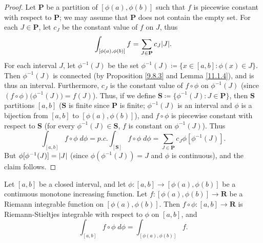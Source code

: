 \begin{proof}
    Let \(\mathbf{P}\) be a partition of \([\phi(a), \phi(b)]\) such that \(f\) is piecewise constant with respect to \(\mathbf{P}\);
    we may assume that \(\mathbf{P}\) does not contain the empty set.
    For each \(J \in \mathbf{P}\), let \(c_J\) be the constant value of \(f\) on \(J\), thus
    \[
        \int_{[\phi(a), \phi(b)]} f = \sum_{J \in \mathbf{P}} c_J \abs*{J}.
    \]
    For each interval \(J\), let \(\phi^{-1}(J)\) be the set \(\phi^{-1}(J) \coloneqq \{x \in [a, b] : \phi(x) \in J\}\).
    Then \(\phi^{-1}(J)\) is connected (by Proposition \ref{9.8.3} and Lemma \ref{11.1.4}), and is thus an interval.
    Furthermore, \(c_J\) is the constant value of \(f \circ \phi\) on \(\phi^{-1}(J)\) (since \((f \circ \phi)\big(\phi^{-1}(J)\big) = f(J)\)).
    Thus, if we define \(\mathbf{S} \coloneqq \{\phi^{-1} (J) : J \in \mathbf{P}\}\), then \(\mathbf{S}\) partitions \([a, b]\)
    (\(\mathbf{S}\) is finite since \(\mathbf{P}\) is finite;
    \(\phi^{-1}(J)\) is an interval and \(\phi\) is a bijection from \([a, b]\) to \([\phi(a), \phi(b)]\)),
    and \(f \circ \phi\) is piecewise constant with respect to \(\mathbf{S}\) (for every \(\phi^{-1}(J) \in \mathbf{S}\), \(f\) is constant on \(\phi^{-1}(J)\)).
    Thus
    \[
        \int_{[a, b]} f \circ \phi \; d \phi = p.c. \int_{[\mathbf{S}]} f \circ \phi \; d \phi = \sum_{J \in \mathbf{P}} c_J \phi[\phi^{-1}(J)].
    \]
    But \(\phi[\phi^{-1}(J)] = \abs*{J}\) (since \(\phi(\phi^{-1}(J)) = J\) and \(\phi\) is continuous), and the claim follows.
\end{proof}

\begin{proposition}\label{11.10.6}
    Let \([a, b]\) be a closed interval, and let \(\phi : [a, b] \to [\phi(a), \phi(b)]\) be a continuous monotone increasing function.
    Let \(f : [\phi(a), \phi(b)] \to \mathbf{R}\) be a Riemann integrable function on \([\phi(a), \phi(b)]\).
    Then \(f \circ \phi : [a, b] \to \mathbf{R}\) is Riemann-Stieltjes integrable with respect to \(\phi\) on \([a, b]\), and
    \[
        \int_{[a, b]} f \circ \phi \; d \phi = \int_{[\phi(a), \phi(b)]} f.
    \]
\end{proposition}

